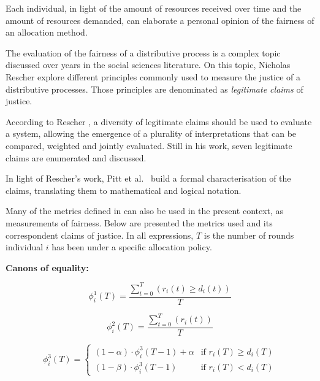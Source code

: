 \documentclass[conference,compsoc]{IEEEtran}
\begin{document}
Each individual, in light of the amount of resources received over time and the amount of resources demanded, can elaborate a personal opinion of the fairness of an allocation method.

The evaluation of the fairness of a distributive process is a complex topic discussed over years in the social sciences literature. On this topic, Nicholas Rescher \cite{Rescher1969} explore different principles commonly used to measure the justice of a distributive processes. Those principles are denominated as \emph{legitimate claims} of justice.

According to Rescher \cite{Rescher1969}, a diversity of legitimate claims should be used to evaluate a system, allowing the emergence of a plurality of interpretations that can be compared, weighted and jointly evaluated. Still in his work, seven legitimate claims are enumerated and discussed.

In light of Rescher's work, Pitt et al.\ \cite{Pitt2012Distributive} build a formal characterisation of the claims, translating them to mathematical and logical notation.

Many of the metrics defined in \cite{Pitt2012Distributive} can also be used in the present context, as measurements of fairness. Below are presented the metrics used and its correspondent claims of justice. In all expressions, $T$ is the number of rounds individual $i$ has been under a specific allocation policy.

\noindent
\textbf{Canons of equality:}

\begin{equation}
  \phi_{i}^{1}(T) = \frac{\displaystyle \sum_{t=0}^T \left ( r_i(t) \geq d_i(t) \right )}{T}
\label{opinion_percentage}  
\end{equation}

\begin{equation}
  \phi_{i}^{2}(T) = \frac{\displaystyle \sum_{t=0}^T \left ( r_i(t) \right )}{T}
\label{opinion_received}  
\end{equation}

\begin{equation}
 \phi_{i}^{3}(T) = 
  \begin{cases} 
  (1 - \alpha) \cdot \phi_{i}^{3}(T-1) +  \alpha & \text{if } r_i(T) \geq d_i(T)\\
  (1 - \beta) \cdot \phi_{i}^{3}(T-1)  & \text{if } r_i(T) < d_i(T)
  \end{cases}
\label{opinion_sat}
\end{equation}
\end{document}
